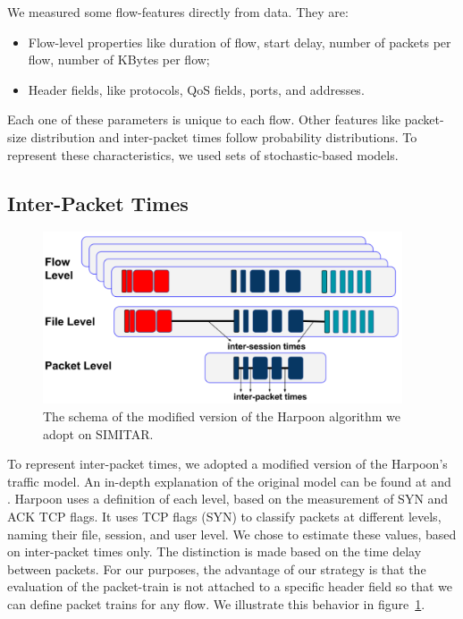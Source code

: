 We measured some flow-features directly from data. They are:

\begin{itemize}
\item Flow-level properties like duration of flow, start delay, number of packets per flow, number of KBytes per flow;
\item Header fields, like protocols, QoS fields, ports, and addresses.
\end{itemize}

Each one of these parameters is unique to each flow. Other features like packet-size distribution and inter-packet times follow probability distributions. To represent these characteristics, we used sets of stochastic-based models.

\subsection{Inter-Packet Times}


\begin{figure}[ht!]
    \centering
    \includegraphics[height=2.0in]{figures/ch3/modified-harpoon-model}
    \caption{The schema of the modified version of the Harpoon algorithm we adopt on SIMITAR.}
    \label{fig:modified-harpoon-model}
\end{figure}


To represent inter-packet times, we adopted a modified version of the Harpoon’s traffic model. An in-depth explanation of the original model can be found at  \cite{harpoon-paper} and \cite{harpoon-validation}. Harpoon uses a definition of each level, based on the measurement of \acrfull{SYN} and \acrfull{ACK} TCP flags. It uses TCP flags (SYN) to classify packets at different levels, naming their file, session, and user level. We chose to estimate these values, based on inter-packet times only. The distinction is made based on the time delay between packets. For our purposes, the advantage of our strategy is that the evaluation of the packet-train is not attached to a specific header field so that we can define packet trains for any flow. We illustrate this behavior in figure~\ref{fig:modified-harpoon-model}.

